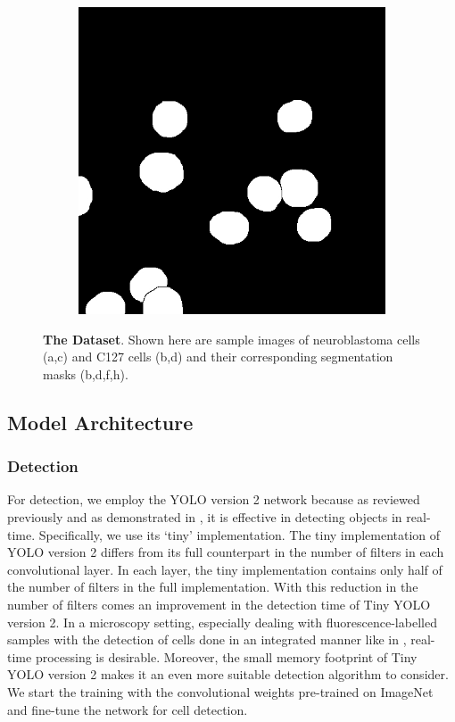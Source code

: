 \documentclass[10pt, journal, compsoc]{IEEEtran}
\begin{document}
\begin{figure}
\begin{subfigure}[b]{0.24\linewidth}
\caption{}
\end{subfigure}
\begin{subfigure}[b]{0.24\linewidth}
\includegraphics[width=\linewidth]{c127/108641-label.jpg}
\caption{}
\end{subfigure}
\caption{\textbf{The Dataset}. Shown here are sample images of neuroblastoma cells (a,c) and C127 cells (b,d) and their corresponding segmentation masks (b,d,f,h). }
\end{figure}
\subsection{Model Architecture}
\subsubsection{Detection}
For detection, we employ the YOLO version 2 network because as reviewed previously and as demonstrated in \cite{Waithe544833}, it is effective in detecting objects in real-time. Specifically, we use its `tiny' implementation. The tiny implementation of YOLO version 2 differs from its full counterpart in the number of filters in each convolutional layer. In each layer, the tiny implementation contains only half of the number of filters in the full implementation. With this reduction in the number of filters comes an improvement in the detection time of Tiny YOLO version 2. In a microscopy setting, especially dealing with fluorescence-labelled samples with the detection of cells done in an integrated manner like in \cite{Waithe544833}, real-time processing is desirable. Moreover, the small memory footprint of Tiny YOLO version 2 makes it an even more suitable detection algorithm to consider. We start the training with the convolutional weights pre-trained on ImageNet and fine-tune the network for cell detection.
\end{document}
